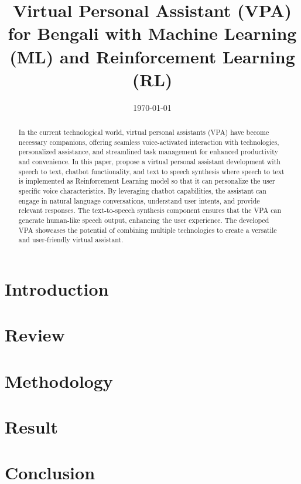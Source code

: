 \documentclass[conference]{IEEEtran}
\title{Virtual Personal Assistant (VPA) for Bengali with Machine Learning (ML) and Reinforcement Learning (RL)}
\author{\IEEEauthorblockN{Sadidul Islam}
\IEEEauthorblockA{\textit{Student, MSCSE} \\
\textit{United Internation University}\\
Bangladesh \\
sadid@soceton.com}
}
\date{\today}
\begin{document}
\maketitle

\begin{abstract}
    In the current technological world, virtual personal assistants (VPA) have become necessary companions, offering seamless voice-activated interaction with technologies, personalized assistance, and streamlined task management for enhanced productivity and convenience.
    In this paper, propose a virtual personal assistant development with speech to text, chatbot functionality, and text to speech synthesis where speech to text is implemented as Reinforcement Learning model so that it can personalize the user specific voice characteristics.
    By leveraging chatbot capabilities, the assistant can engage in natural language conversations, understand user intents, and provide relevant responses.
    The text-to-speech synthesis component ensures that the VPA can generate human-like speech output, enhancing the user experience.
    The developed VPA showcases the potential of combining multiple technologies to create a versatile and user-friendly virtual assistant.
\end{abstract}

\section{Introduction}\label{sec:introduction}


\section{Review}\label{sec:review}


\section{Methodology}\label{sec:methodology}


\section{Result}\label{sec:result}


\section{Conclusion}\label{sec:conclusion}



\end{document}
